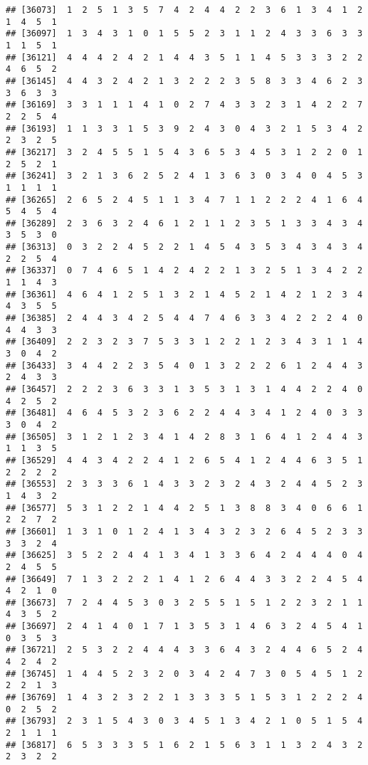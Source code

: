 \documentclass[
]{article}
\begin{document}
\begin{verbatim}
## [36073]  1  2  5  1  3  5  7  4  2  4  4  2  2  3  6  1  3  4  1  2  1  4  5  1
## [36097]  1  3  4  3  1  0  1  5  5  2  3  1  1  2  4  3  3  6  3  3  1  1  5  1
## [36121]  4  4  4  2  4  2  1  4  4  3  5  1  1  4  5  3  3  3  2  2  4  6  5  2
## [36145]  4  4  3  2  4  2  1  3  2  2  2  3  5  8  3  3  4  6  2  3  3  6  3  3
## [36169]  3  3  1  1  1  4  1  0  2  7  4  3  3  2  3  1  4  2  2  7  2  2  5  4
## [36193]  1  1  3  3  1  5  3  9  2  4  3  0  4  3  2  1  5  3  4  2  2  3  2  5
## [36217]  3  2  4  5  5  1  5  4  3  6  5  3  4  5  3  1  2  2  0  1  2  5  2  1
## [36241]  3  2  1  3  6  2  5  2  4  1  3  6  3  0  3  4  0  4  5  3  1  1  1  1
## [36265]  2  6  5  2  4  5  1  1  3  4  7  1  1  2  2  2  4  1  6  4  5  4  5  4
## [36289]  2  3  6  3  2  4  6  1  2  1  1  2  3  5  1  3  3  4  3  4  3  5  3  0
## [36313]  0  3  2  2  4  5  2  2  1  4  5  4  3  5  3  4  3  4  3  4  2  2  5  4
## [36337]  0  7  4  6  5  1  4  2  4  2  2  1  3  2  5  1  3  4  2  2  1  1  4  3
## [36361]  4  6  4  1  2  5  1  3  2  1  4  5  2  1  4  2  1  2  3  4  4  3  5  5
## [36385]  2  4  4  3  4  2  5  4  4  7  4  6  3  3  4  2  2  2  4  0  4  4  3  3
## [36409]  2  2  3  2  3  7  5  3  3  1  2  2  1  2  3  4  3  1  1  4  3  0  4  2
## [36433]  3  4  4  2  2  3  5  4  0  1  3  2  2  2  6  1  2  4  4  3  2  4  3  3
## [36457]  2  2  2  3  6  3  3  1  3  5  3  1  3  1  4  4  2  2  4  0  4  2  5  2
## [36481]  4  6  4  5  3  2  3  6  2  2  4  4  3  4  1  2  4  0  3  3  3  0  4  2
## [36505]  3  1  2  1  2  3  4  1  4  2  8  3  1  6  4  1  2  4  4  3  1  1  3  5
## [36529]  4  4  3  4  2  2  4  1  2  6  5  4  1  2  4  4  6  3  5  1  2  2  2  2
## [36553]  2  3  3  3  6  1  4  3  3  2  3  2  4  3  2  4  4  5  2  3  1  4  3  2
## [36577]  5  3  1  2  2  1  4  4  2  5  1  3  8  8  3  4  0  6  6  1  2  2  7  2
## [36601]  1  3  1  0  1  2  4  1  3  4  3  2  3  2  6  4  5  2  3  3  3  3  2  4
## [36625]  3  5  2  2  4  4  1  3  4  1  3  3  6  4  2  4  4  4  0  4  2  4  5  5
## [36649]  7  1  3  2  2  2  1  4  1  2  6  4  4  3  3  2  2  4  5  4  4  2  1  0
## [36673]  7  2  4  4  5  3  0  3  2  5  5  1  5  1  2  2  3  2  1  1  4  3  5  2
## [36697]  2  4  1  4  0  1  7  1  3  5  3  1  4  6  3  2  4  5  4  1  0  3  5  3
## [36721]  2  5  3  2  2  4  4  4  3  3  6  4  3  2  4  4  6  5  2  4  4  2  4  2
## [36745]  1  4  4  5  2  3  2  0  3  4  2  4  7  3  0  5  4  5  1  2  2  2  1  3
## [36769]  1  4  3  2  3  2  2  1  3  3  3  5  1  5  3  1  2  2  2  4  0  2  5  2
## [36793]  2  3  1  5  4  3  0  3  4  5  1  3  4  2  1  0  5  1  5  4  2  1  1  1
## [36817]  6  5  3  3  3  5  1  6  2  1  5  6  3  1  1  3  2  4  3  2  2  3  2  2

\end{verbatim}
\end{document}
